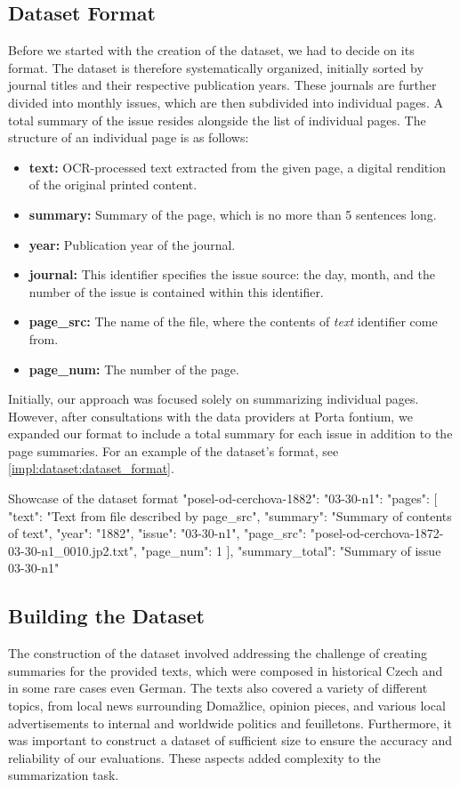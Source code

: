 \documentclass[english, ba, kiv, he, iso690numb, pdf, viewonly]{fasthesis}
\begin{document}
\subsection{Dataset Format}
Before we started with the creation of the dataset, we had to decide on its format.
The dataset is therefore systematically organized, initially sorted by journal titles and their respective publication years. These journals are further divided into monthly issues, which are then subdivided into individual pages. A total summary of the issue resides alongside the list of individual pages. The structure of an individual page is as follows:
\begin{itemize}
	\item \textbf{text:} OCR-processed text extracted from the given page, a digital rendition of the original printed content.
	\item \textbf{summary:} Summary of the page, which is no more than 5 sentences long.
	\item \textbf{year:} Publication year of the journal.
	\item \textbf{journal:} This identifier specifies the issue source: the day, month, and the number of the issue is contained within this identifier.
	\item \textbf{page\_src:} The name of the file, where the contents of \textit{text} identifier come from.
	\item \textbf{page\_num:} The number of the page.
\end{itemize}
Initially, our approach was focused solely on summarizing individual pages. However, after consultations with the data providers at Porta fontium, we expanded our format to include a total summary for each issue in addition to the page summaries. For an example of the dataset's format, see \ref{impl:dataset:dataset_format}. 
\begin{code}{}{Showcase of the dataset format\label{impl:dataset:dataset_format}}
	{
		"posel-od-cerchova-1882": {
			"03-30-n1": {
				"pages": [
				{
					"text": "Text from file described by page_src",
					"summary": "Summary of contents of text",
					"year": "1882",
					"issue": "03-30-n1",
					"page_src": "posel-od-cerchova-1872-03-30-n1_0010.jp2.txt",
					"page_num": 1
				}
				],
				"summary_total": "Summary of issue 03-30-n1"
			}
		}
	}
\end{code}
\subsection{Building the Dataset}
The construction of the dataset involved addressing the challenge of creating summaries for the provided texts, which were composed in historical Czech and in some rare cases even German. The texts also covered a variety of different topics, from local news surrounding Domažlice, opinion pieces, and various local advertisements to internal and worldwide politics and feuilletons. Furthermore, it was important to construct a dataset of sufficient size to ensure the accuracy and reliability of our evaluations. These aspects added complexity to the summarization task.
\end{document}

